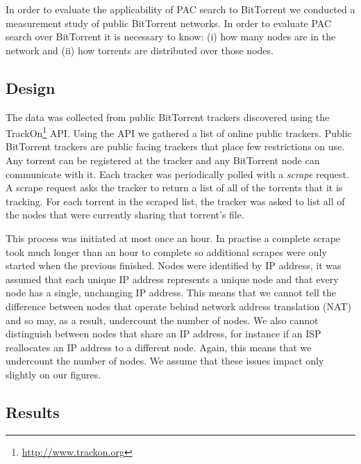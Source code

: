In order to evaluate the applicability of PAC search to BitTorrent we conducted a measurement study of public BitTorrent networks. In order to evaluate PAC search over BitTorrent it is necessary to know: (i) how many nodes are in the network and (ii) how torrents are distributed over those nodes.

\subsection{Design}

    The data was collected from public BitTorrent trackers discovered using the TrackOn\footnote{\url{http://www.trackon.org}} API. Using the API we gathered a list of online public trackers. Public BitTorrent trackers are public facing trackers that place few restrictions on use. Any torrent can be registered at the tracker and any BitTorrent node can communicate with it. Each tracker was periodically polled with a \emph{scrape} request. A scrape request asks the tracker to return a list of all of the torrents that it is tracking. For each torrent in the scraped list, the tracker was asked to list all of the nodes that were currently sharing that torrent's file.

    This process was initiated at most once an hour. In practise a complete scrape took much longer than an hour to complete so additional scrapes were only started when the previous finished. Nodes were identified by IP address, it was assumed that each unique IP address represents a unique node and that every node has a single, unchanging IP address. This means that we cannot tell the difference between nodes that operate behind network address translation (NAT) and so may, as a result, undercount the number of nodes. We also cannot distinguish between nodes that share an IP address, for instance if an ISP reallocates an IP address to a different node. Again, this means that we undercount the number of nodes. We assume that these issues impact only slightly on our figures.

\subsection{Results}

